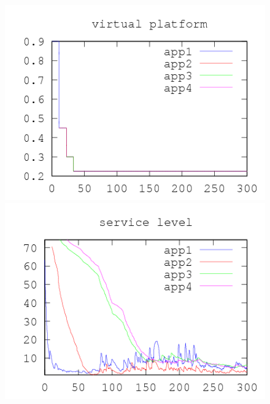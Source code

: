 \documentclass[nobiblatex]{LTHthesis}
\begin{document}
\begin{figure}[th]
\centering
  \begin{minipage}{0.49\textwidth}
  \centering
  \includegraphics[width=\textwidth]{"tools/plot/logs/test3/vp"}
  \end{minipage}
  \hfill
  \begin{minipage}{0.49\textwidth}
  \centering
  \includegraphics[width=\textwidth]{"tools/plot/logs/test3/sl"}
  \end{minipage}
  \begin{minipage}{0.49\textwidth}
  \centering

\end{minipage}
\end{figure}
\end{document}
